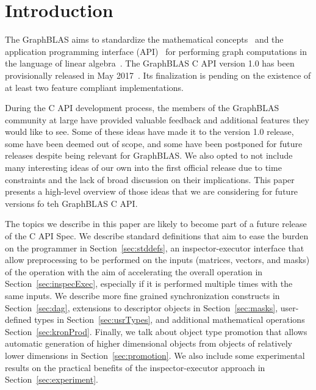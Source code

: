 %
%
\section{Introduction}
\label{sec:intro}
The GraphBLAS aims to standardize the mathematical concepts~\cite{mathgraphblas16} and the application programming interface (API)~\cite{graphblas_capi_17} for performing graph computations in the language of linear algebra~\cite{kepner2011graph}. The GraphBLAS C API version 1.0 has been provisionally released in May 2017~\cite{graphblasapi}. Its finalization is pending on the existence of at least two feature compliant implementations. 

During the C API development process, the members of the GraphBLAS community at large have provided valuable feedback and additional features they would like to see. Some of these ideas have made it to the version 1.0 release, some have been deemed out of scope, and some have been postponed for future releases despite being relevant for GraphBLAS. We also opted to not include many interesting ideas of our own into the first official release due to time constraints and the lack of broad discussion on their implications. This paper presents a high-level overview of those ideas that we are considering for future versions fo teh GraphBLAS C API.

The topics we describe in this paper are likely to become part of a future release of the C API Spec. We describe standard definitions that aim to ease the burden on the programmer in Section~\ref{sec:stddefs}, an inspector-executor interface that allow preprocessing to be performed on the inputs (matrices, vectors, and masks) of the operation with the aim of accelerating the overall operation in Section~\ref{sec:inspecExec}, especially if it is performed multiple times with the same inputs.
We describe more fine grained synchronization constructs in Section~\ref{sec:dag}, extensions to descriptor objects in Section~\ref{sec:masks}, user-defined types in Section~\ref{sec:usrTypes}, and additional mathematical operations Section~\ref{sec:kronProd}. Finally, we talk about object type promotion that allows automatic generation of higher dimensional objects from objects of relatively lower dimensions in Section~\ref{sec:promotion}. We also include some experimental results on the practical benefits of the inspector-executor approach in Section~\ref{sec:experiment}. 

